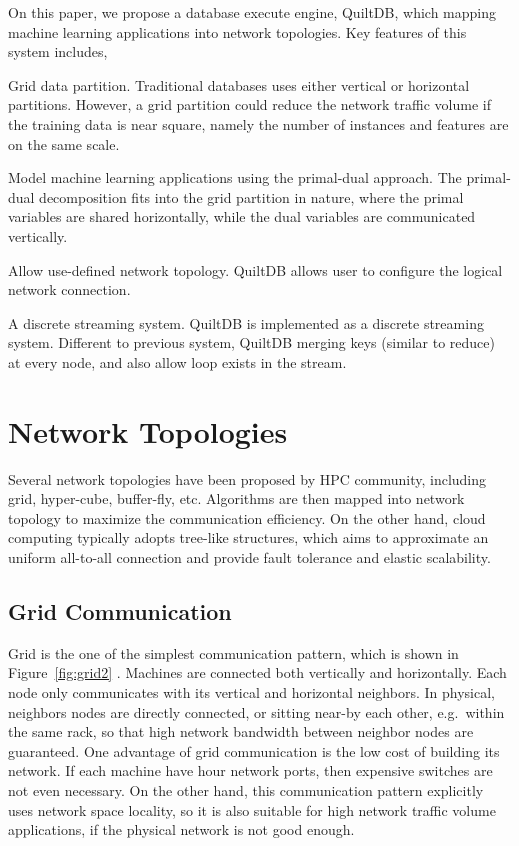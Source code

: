 \documentclass[11pt, twocolumn]{article}
\begin{document}
On this paper, we propose a database execute engine, QuiltDB, which mapping
machine learning applications into network topologies. Key features of this
system includes,

\begin{itemize*}
\item Grid data partition. Traditional databases uses either vertical or
  horizontal partitions. However, a grid partition could reduce the network
  traffic volume if the training data is near square, namely the number of
  instances and features are on the same scale.
\item Model machine learning applications using the
  primal-dual approach. The primal-dual decomposition fits into the grid
  partition in nature, where the primal variables are shared horizontally, while
  the dual variables are communicated vertically.
\item Allow use-defined network topology. QuiltDB allows user to configure the
  logical network connection.
\item A discrete streaming system. QuiltDB is implemented as a discrete
  streaming system. Different to previous system, QuiltDB merging keys (similar
  to reduce) at every node, and also allow loop exists in the stream.
\end{itemize*}

\section{Network Topologies}
\label{sec:network-topologies}

Several network topologies have been proposed by HPC community, including grid,
hyper-cube, buffer-fly, etc. Algorithms are then mapped into network topology to
maximize the communication efficiency. On the other hand, cloud computing
typically adopts
tree-like structures, which aims to approximate an uniform all-to-all connection
and provide fault tolerance and elastic scalability.

\subsection{Grid Communication}

Grid is the one of the simplest communication pattern, which is shown in
Figure~\ref{fig:grid2} \cite{DeeBlyGilKesetal04, FosZhaRaiLu08}. Machines are connected both vertically and
horizontally. Each node only communicates with its vertical and horizontal
neighbors. In physical, neighbors nodes are directly connected, or sitting
near-by each other, e.g.~within the same rack,  so that high network bandwidth
between neighbor nodes are guaranteed. One advantage of grid communication is
the low cost of building its network. If each machine have hour network ports,
then expensive switches are not even necessary. On the other hand, this
communication pattern explicitly uses network space locality, so it is also
suitable for high network traffic volume applications, if the physical network
is not good enough.
\end{document}
